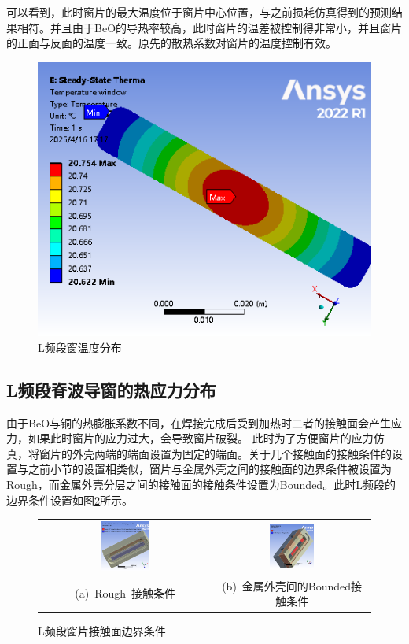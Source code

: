 \documentclass[master]{thesis-uestc}
\begin{document}
可以看到，此时窗片的最大温度位于窗片中心位置，与之前损耗仿真得到的预测结果相符。并且由于BeO的导热率较高，此时窗片的温差被控制得非常小，并且窗片的正面与反面的温度一致。原先的散热系数对窗片的温度控制有效。
\begin{figure}[!htb]
    \centering
    \includegraphics[width=0.4\linewidth]{pic/chapter4/L频段窗温度分布.png}
    \caption{L频段窗温度分布}
    \label{fig:L频段窗温度分布}
\end{figure}

\subsection{L频段脊波导窗的热应力分布}
由于BeO与铜的热膨胀系数不同，在焊接完成后受到加热时二者的接触面会产生应力，如果此时窗片的应力过大，会导致窗片破裂。
此时为了方便窗片的应力仿真，将窗片的外壳两端的端面设置为固定的端面。关于几个接触面的接触条件的设置与之前小节的设置相类似，窗片与金属外壳之间的接触面的边界条件被设置为Rough，而金属外壳分层之间的接触面的接触条件设置为Bounded。此时L频段的边界条件设置如图\ref{fig:L频段接触面边界条件}所示。
\begin{figure}[!htb]
    \small
    \centering
    \begin{tabular}{@{\ }c@{\ }c}
        \includegraphics[width=0.3\textwidth]{pic/chapter4/窗与金属外壳的Rough边界条件.png} & 
        \hspace{5pt}
        \includegraphics[width=0.3\textwidth]{pic/chapter4/金属外壳的Bounded边界条件.png}     \\
        \mbox{\small (a) Rough 接触条件}                                                                               & 
        \mbox{\small (b) 金属外壳间的Bounded接触条件}                                                                                  \\
    \end{tabular}
    \caption{L频段窗片接触面边界条件}
    \label{fig:L频段接触面边界条件}
\end{figure}
\end{document}
